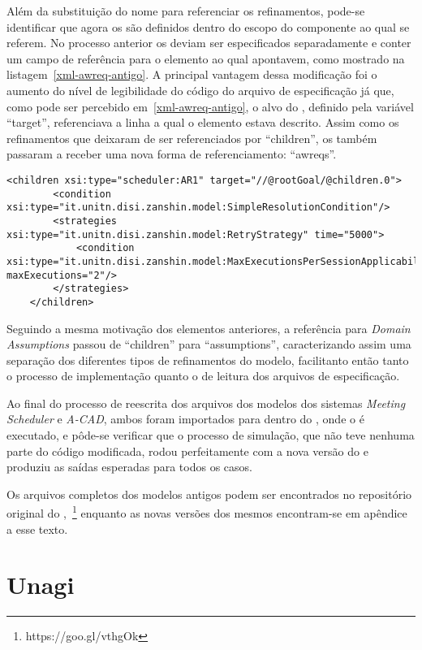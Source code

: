 Além da substituição do nome para referenciar os refinamentos, pode-se identificar que agora os \awreqs são definidos dentro do escopo do componente ao qual se referem. No processo anterior os \awreqs deviam ser especificados separadamente e conter um campo de referência para o elemento ao qual apontavem, como mostrado na listagem~\ref{xml-awreq-antigo}. A principal vantagem dessa modificação foi o aumento do nível de legibilidade do código do arquivo de especificação já que, como pode ser percebido em~\ref{xml-awreq-antigo}, o alvo do \awreq, definido pela variável ``target'', referenciava a linha a qual o elemento estava descrito. Assim como os refinamentos que deixaram de ser referenciados por ``children'', os \awreqs também passaram a receber uma nova forma de referenciamento: ``awreqs''.
 
\begin{lstlisting}[caption={Trecho de XML representando o ACAD no metamodelo original},label={xml-awreq-antigo}]
	<children xsi:type="scheduler:AR1" target="//@rootGoal/@children.0">
		<condition xsi:type="it.unitn.disi.zanshin.model:SimpleResolutionCondition"/>
		<strategies xsi:type="it.unitn.disi.zanshin.model:RetryStrategy" time="5000">
			<condition xsi:type="it.unitn.disi.zanshin.model:MaxExecutionsPerSessionApplicabilityCondition" maxExecutions="2"/>
		</strategies>
	</children>
\end{lstlisting}

Seguindo a mesma motivação dos elementos anteriores, a referência para \textit{Domain Assumptions} passou de ``children'' para ``assumptions'', caracterizando assim uma separação dos diferentes tipos de refinamentos do modelo, facilitanto então tanto o processo de implementação quanto o de leitura dos arquivos de especificação. 

Ao final do processo de reescrita dos arquivos dos modelos dos sistemas \textit{Meeting Scheduler} e \textit{A-CAD}, ambos foram importados para dentro do \eclipse, onde o \zanshin é executado, e pôde-se verificar que o processo de simulação, que não teve nenhuma parte do código modificada, rodou perfeitamente com a nova versão do \zanshin e produziu as saídas esperadas para todos os casos.

Os arquivos completos dos modelos antigos podem ser encontrados no repositório original do \framework,~\footnote{https://goo.gl/vthgOk} enquanto as novas versões dos mesmos encontram-se em apêndice a esse texto.

\section{Unagi}

